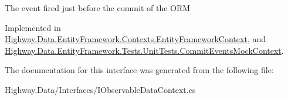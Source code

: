 The event fired just before the commit of the O\-R\-M 



Implemented in \hyperlink{class_highway_1_1_data_1_1_entity_framework_1_1_contexts_1_1_entity_framework_context_a4e307f212412dfd562cd70640d67709b}{Highway.\-Data.\-Entity\-Framework.\-Contexts.\-Entity\-Framework\-Context}, and \hyperlink{class_highway_1_1_data_1_1_entity_framework_1_1_tests_1_1_unit_tests_1_1_commit_events_mock_context_aa0f16907356bb3a01e37d470e929c88a}{Highway.\-Data.\-Entity\-Framework.\-Tests.\-Unit\-Tests.\-Commit\-Events\-Mock\-Context}.



The documentation for this interface was generated from the following file\-:\begin{DoxyCompactItemize}
\item 
Highway.\-Data/\-Interfaces/I\-Observable\-Data\-Context.\-cs\end{DoxyCompactItemize}
